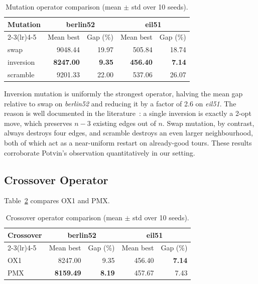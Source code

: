 \documentclass[conference]{IEEEtran}
\begin{document}
\begin{table}[h]
\caption{Mutation operator comparison (mean $\pm$ std over 10 seeds).}
\label{tab:mutation}
\centering
\begin{tabular}{lrrrr}
\toprule
\multicolumn{1}{l}{\textbf{Mutation}} &
\multicolumn{2}{c}{\textbf{berlin52}} &
\multicolumn{2}{c}{\textbf{eil51}} \\
\cmidrule(lr){2-3}\cmidrule(lr){4-5}
& Mean best & Gap (\%) & Mean best & Gap (\%) \\
\midrule
swap      & 9048.44 & 19.97 & 505.84 & 18.74 \\
inversion & \textbf{8247.00} & \textbf{9.35} & \textbf{456.40} & \textbf{7.14} \\
scramble  & 9201.33 & 22.00 & 537.06 & 26.07 \\
\bottomrule
\end{tabular}
\end{table}

Inversion mutation is uniformly the strongest operator, halving the mean
gap relative to swap on \textit{berlin52} and reducing it by a factor of
2.6 on \textit{eil51}. The reason is well documented in the
literature~\cite{potvin1996}: a single inversion is exactly a 2-opt move,
which preserves $n-3$ existing edges out of $n$. Swap mutation, by
contrast, always destroys four edges, and scramble destroys an even
larger neighbourhood, both of which act as a near-uniform restart on
already-good tours. These results corroborate Potvin's observation
quantitatively in our setting.

\subsection{Crossover Operator}

Table~\ref{tab:crossover} compares OX1 and PMX.

\begin{table}[h]
\caption{Crossover operator comparison (mean $\pm$ std over 10 seeds).}
\label{tab:crossover}
\centering
\begin{tabular}{lrrrr}
\toprule
\multicolumn{1}{l}{\textbf{Crossover}} &
\multicolumn{2}{c}{\textbf{berlin52}} &
\multicolumn{2}{c}{\textbf{eil51}} \\
\cmidrule(lr){2-3}\cmidrule(lr){4-5}
& Mean best & Gap (\%) & Mean best & Gap (\%) \\
\midrule
OX1 & 8247.00 & 9.35 & 456.40 & \textbf{7.14} \\
PMX & \textbf{8159.49} & \textbf{8.19} & 457.67 & 7.43 \\
\bottomrule
\end{tabular}
\end{table}
\end{document}
